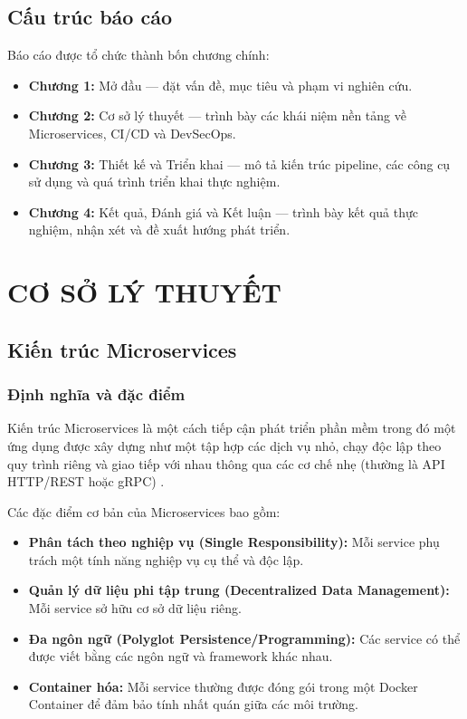 \documentclass[12pt,a4paper]{report}
\begin{document}
\section{Cấu trúc báo cáo}

Báo cáo được tổ chức thành bốn chương chính:
\begin{itemize}[leftmargin=2cm]
    \item \textbf{Chương 1:} Mở đầu --- đặt vấn đề, mục tiêu và phạm vi nghiên cứu.
    \item \textbf{Chương 2:} Cơ sở lý thuyết --- trình bày các khái niệm nền tảng về Microservices, CI/CD và DevSecOps.
    \item \textbf{Chương 3:} Thiết kế và Triển khai --- mô tả kiến trúc pipeline, các công cụ sử dụng và quá trình triển khai thực nghiệm.
    \item \textbf{Chương 4:} Kết quả, Đánh giá và Kết luận --- trình bày kết quả thực nghiệm, nhận xét và đề xuất hướng phát triển.
\end{itemize}

\chapter{CƠ SỞ LÝ THUYẾT}

\section{Kiến trúc Microservices}

\subsection{Định nghĩa và đặc điểm}

Kiến trúc Microservices là một cách tiếp cận phát triển phần mềm trong đó một ứng dụng được xây dựng như một tập hợp các dịch vụ nhỏ, chạy độc lập theo quy trình riêng và giao tiếp với nhau thông qua các cơ chế nhẹ (thường là API HTTP/REST hoặc gRPC) \cite{newman2015microservices}.

Các đặc điểm cơ bản của Microservices bao gồm:
\begin{itemize}[leftmargin=2cm]
    \item \textbf{Phân tách theo nghiệp vụ (Single Responsibility):} Mỗi service phụ trách một tính năng nghiệp vụ cụ thể và độc lập.
    \item \textbf{Quản lý dữ liệu phi tập trung (Decentralized Data Management):} Mỗi service sở hữu cơ sở dữ liệu riêng.
    \item \textbf{Đa ngôn ngữ (Polyglot Persistence/Programming):} Các service có thể được viết bằng các ngôn ngữ và framework khác nhau.
    \item \textbf{Container hóa:} Mỗi service thường được đóng gói trong một Docker Container để đảm bảo tính nhất quán giữa các môi trường.
\end{itemize}
\end{document}
